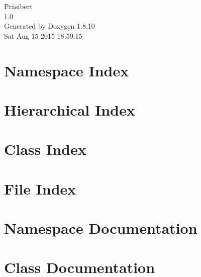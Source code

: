 \documentclass[twoside]{book}
\newcommand{\+}{\discretionary{\mbox{\scriptsize$\hookleftarrow$}}{}{}}
\newcommand{\clearemptydoublepage}{%
  \newpage{\pagestyle{empty}\cleardoublepage}%
}
\begin{document}
\hypersetup{pageanchor=false,
             bookmarks=true,
             bookmarksnumbered=true,
             pdfencoding=unicode
            }
\begin{titlepage}
\vspace*{7cm}
\begin{center}%
{\Large Präsibert \\[1ex]\large 1.\+0 }\\
\vspace*{1cm}
{\large Generated by Doxygen 1.8.10}\\
\vspace*{0.5cm}
{\small Sat Aug 15 2015 18:59:15}\\
\end{center}
\end{titlepage}
\clearemptydoublepage
\tableofcontents
\clearemptydoublepage
{}
\hypersetup{pageanchor=true}

\chapter{Namespace Index}

\chapter{Hierarchical Index}

\chapter{Class Index}

\chapter{File Index}

\chapter{Namespace Documentation}




\chapter{Class Documentation}




























\end{document}
